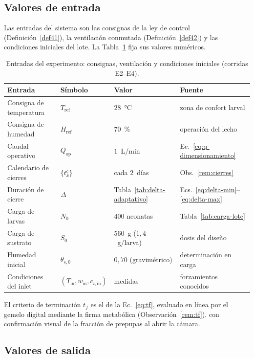 \subsection{Valores de entrada}\label{sec:entradas}

Las entradas del sistema son las consignas de la ley de control
(Definición~\ref{def41}), la ventilación conmutada (Definición~\ref{def42}) y
las condiciones iniciales del lote. La Tabla~\ref{tab:entradas} fija sus
valores numéricos.

\begin{table}[htbp]
  \centering
  \caption{Entradas del experimento: consignas, ventilación y condiciones
  iniciales (corridas E2--E4).}
  \label{tab:entradas}
  \begin{tabular}{llll}
    \hline
    Entrada & Símbolo & Valor & Fuente \\
    \hline
    Consigna de temperatura & $T_{\mathrm{ref}}$ & $28$~°C & zona de confort larval \\
    Consigna de humedad & $H_{\mathrm{ref}}$ & $70$~\% & operación del lecho \\
    Caudal operativo & $Q_{\mathrm{op}}$ & $1$~L/min & Ec.~\eqref{eq:q-dimensionamiento} \\
    Calendario de cierres & $\{t_k^c\}$ & cada $2$~días & Obs.~\ref{rem:cierres} \\
    Duración de cierre & $\Delta$ & Tabla~\ref{tab:delta-adaptativo} & Ecs.~\eqref{eq:delta-min}--\eqref{eq:delta-max} \\
    Carga de larvas & $N_0$ & $400$ neonatas & Tabla~\ref{tab:carga-lote} \\
    Carga de sustrato & $S_0$ & $560$~g ($1{,}4$~g/larva) & dosis del diseño \\
    Humedad inicial & $\theta_{s,0}$ & $0{,}70$ (gravimétrico) & determinación en carga \\
    Condiciones del inlet & $(T_{\mathrm{in}}, w_{\mathrm{in}}, c_{i,\mathrm{in}})$ & medidas & forzamientos conocidos \\
    \hline
  \end{tabular}
\end{table}

El criterio de terminación $t_f$ es el de la Ec.~\eqref{eq:tf}, evaluado en
línea por el gemelo digital mediante la firma metabólica
(Observación~\ref{rem:tf}), con confirmación visual de la fracción de
prepupas al abrir la cámara.

\subsection{Valores de salida}\label{sec:salidas}

